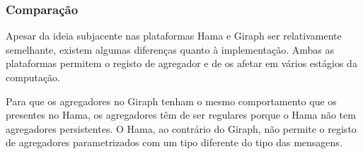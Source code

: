   \subsubsection*{Comparação}
  
  Apesar da ideia subjacente nas plataformas Hama e Giraph ser 
relativamente semelhante, existem algumas diferenças quanto à implementação. 
Ambas as plataformas
  permitem o registo de agregador e de os afetar em vários estágios da computação. 
  
  Para que os agregadores no Giraph tenham o mesmo comportamento que os presentes no Hama, os agregadores têm de ser regulares porque o Hama não tem agregadores persistentes. O Hama, ao contrário do Giraph, não permite o registo de agregadores parametrizados com um tipo diferente do tipo das mensagens.
  
